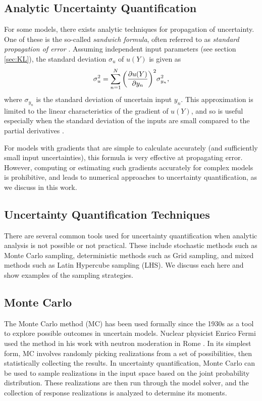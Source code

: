 \subsection{Analytic Uncertainty Quantification}
For some models, there exists analytic techniques for propagation of uncertainty.  One of these is the
so-called \emph{sandwich formula}, often referred to as \emph{standard propagation of error} \cite{sandwich}.
Assuming independent input parameters (see section \ref{sec:KL}), the standard deviation $\sigma_u$ of $u(Y)$
is given as
\begin{equation}
  \sigma^2_u = \sum_{n=1}^N \qty(\pdv{u(Y)}{y_n})^2\sigma_{y_n}^2,
\end{equation}
where $\sigma_{y_n}$ is the standard deviation of uncertain input $y_n$.  This approximation is limited to the
linear characteristics of the gradient of $u(Y)$, and so is useful especially when the standard deviation of
the inputs are small compared to the partial derivatives \cite{sandwich2}.

For models with gradients that are simple to calculate accurately (and sufficiently small input
uncertainties), this formula is very effective at propagating error.  However, computing or estimating such
gradients accurately for complex models is prohibitive, and leads to numerical approaches to uncertainty
quantification, as we discuss in this work.


\subsection{Uncertainty Quantification Techniques}
There are several common tools used for uncertainty quantification when analytic analysis is not possible or
not practical.
These include stochastic methods such as Monte Carlo sampling, deterministic methods such as Grid sampling,
and mixed methods such as Latin Hypercube sampling (LHS). We discuss each here and show examples of the
sampling strategies.

\subsection{Monte Carlo}
The Monte Carlo method (MC) \cite{mc} has been used formally since the 1930s as a tool to explore possible outcomes
in uncertain models.  Nuclear physicist Enrico Fermi used the method in his work with neutron moderation in
Rome \cite{mcfermi}.  In its simplest form, MC involves randomly picking realizations from a set of
possibilities, then statistically collecting the results.  In uncertainty quantification, Monte Carlo can be
used to sample realizations in the input space based on the joint probability distribution.  These
realizations are then run through the model solver, and the collection of
response realizations is analyzed to determine its moments.

